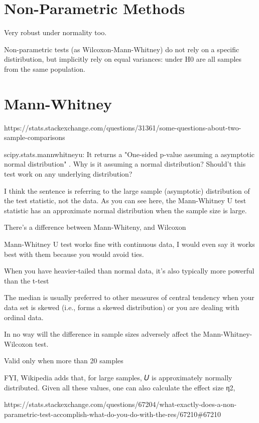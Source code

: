 \documentclass[11pt]{article}
\begin{document}
    \section{Non-Parametric Methods}\label{non-parametric-methods}

Very robust under normality too.

Non-parametric tests (as Wilcoxon-Mann-Whitney) do not rely on a
specific distiribution, but implicitly rely on equal variances: under H0
are all samples from the same population.

\section{Mann-Whitney}\label{mann-whitney}

https://stats.stackexchange.com/questions/31361/some-questions-about-two-sample-comparisons

scipy.stats.mannwhitneyu: It returns a "One-sided p-value assuming a
asymptotic normal distribution" . Why is it assuming a normal
distribution? Should't this test work on any underlying distribution?

I think the sentence is referring to the large sample (asymptotic)
distribution of the test statistic, not the data. As you can see here,
the Mann-Whitney U test statistic has an approximate normal distribution
when the sample size is large.

There's a difference between Mann-Whiteny, and Wilcoxon

Mann-Whitney U test works fine with continuous data, I would even say it
works best with them because you would avoid ties.

When you have heavier-tailed than normal data, it's also typically more
powerful than the t-test

The median is usually preferred to other measures of central tendency
when your data set is skewed (i.e., forms a skewed distribution) or you
are dealing with ordinal data.

In no way will the difference in sample sizes adversely affect the
Mann-Whitney-Wilcoxon test.

Valid only when more than 20 samples

FYI, Wikipedia adds that, for large samples, 𝑈 is approximately normally
distributed. Given all these values, one can also calculate the effect
size η2,

https://stats.stackexchange.com/questions/67204/what-exactly-does-a-non-parametric-test-accomplish-what-do-you-do-with-the-res/67210\#67210
\end{document}
